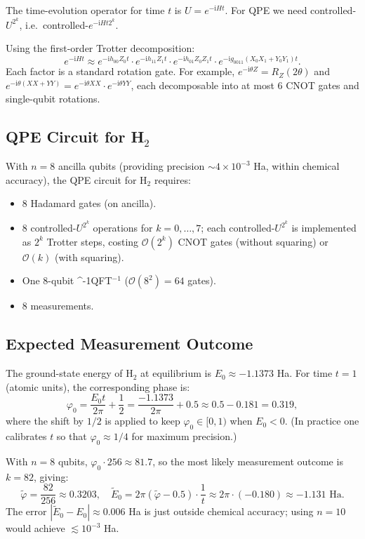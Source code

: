 \documentclass[12pt,a4paper]{article}
\newcommand{\IQFT}{\ifmmode \text{\textsc{QFT}}^{-1}\else \textsc{QFT}$^{-1}$\fi}
\newcommand{\ii}{\mathrm{i}}
\newcommand{\bigO}{\mathcal{O}}
\begin{document}
The time-evolution operator for time $t$ is $U = e^{-\ii Ht}$.  For QPE we need
controlled-$U^{2^k}$, i.e.\ controlled-$e^{-\ii H t 2^k}$.

Using the first-order Trotter decomposition:
\[
  e^{-\ii Ht} \approx
    e^{-\ii h_{00} Z_0 t}
    \cdot e^{-\ii h_{11} Z_1 t}
    \cdot e^{-\ii h_{01} Z_0 Z_1 t}
    \cdot e^{-\ii g_{0011}(X_0 X_1 + Y_0 Y_1) t}.
\]
Each factor is a standard rotation gate.  For example,
$e^{-\ii\theta Z} = R_Z(2\theta)$ and
$e^{-\ii\theta(XX+YY)} = e^{-\ii\theta XX}\cdot e^{-\ii\theta YY}$,
each decomposable into at most 6 CNOT gates and single-qubit rotations.

\subsection{QPE Circuit for \texorpdfstring{H$_2$}{H2}}

With $n = 8$ ancilla qubits (providing precision $\sim 4\times 10^{-3}$ Ha,
within chemical accuracy), the QPE circuit for H$_2$ requires:
\begin{itemize}[leftmargin=*]
  \item 8 Hadamard gates (on ancilla).
  \item 8 controlled-$U^{2^k}$ operations for $k=0,\ldots,7$; each
        controlled-$U^{2^k}$ is implemented as $2^k$ Trotter steps, costing
        $\bigO(2^k)$ CNOT gates (without squaring) or $\bigO(k)$ (with squaring).
  \item One 8-qubit \IQFT{} ($\bigO(8^2) = 64$ gates).
  \item 8 measurements.
\end{itemize}

\subsection{Expected Measurement Outcome}

The ground-state energy of H$_2$ at equilibrium is $E_0 \approx -1.1373$ Ha.
For time $t = 1$ (atomic units), the corresponding phase is:
\[
  \varphi_0 = \frac{E_0 t}{2\pi} + \frac{1}{2}
  = \frac{-1.1373}{2\pi} + 0.5
  \approx 0.5 - 0.181
  = 0.319,
\]
where the shift by $1/2$ is applied to keep $\varphi_0 \in [0,1)$ when
$E_0 < 0$.  (In practice one calibrates $t$ so that $\varphi_0 \approx 1/4$
for maximum precision.)

With $n=8$ qubits, $\varphi_0 \cdot 256 \approx 81.7$, so the most likely
measurement outcome is $k=82$, giving:
\[
  \tilde\varphi = \frac{82}{256} \approx 0.3203,\quad
  \tilde E_0 = 2\pi(\tilde\varphi - 0.5)\cdot\frac{1}{t}
  \approx 2\pi\cdot(-0.180) \approx -1.131 \text{ Ha}.
\]
The error $|\tilde E_0 - E_0| \approx 0.006$ Ha is just outside chemical
accuracy; using $n=10$ would achieve $\lesssim 10^{-3}$ Ha.
\end{document}
